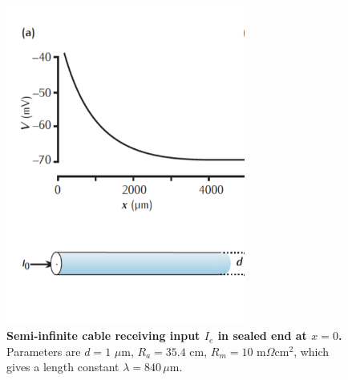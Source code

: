 \begin{figure}[!ht]
\begin{center}
\includegraphics[width=0.7\textwidth]{Figures/Neuron/Semiinf.png}
\end{center}
\caption{\textbf{Semi-infinite cable receiving input $I_e$ in sealed end at $x=0$.} Parameters are $d = 1$ $\mu$m, $R_a=35.4$ cm, $R_m = 10$ m$\Omega$cm$^2$, which gives a length constant $\lambda = 840\, \mu$m. }
\label{Neuron:fig:Semiinf}
\end{figure}

